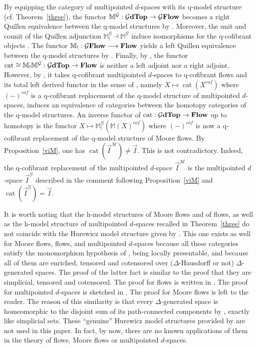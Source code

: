 \documentclass[a4paper,12pt]{amsart}
\renewcommand{\vec}{\overrightarrow}
\theoremstyle{definition}
\newcommand{\iso}{\cong}
\newcommand{\vI}{\vec{I}}
\newcommand{\ptop}[1]{{\brm{{#1}dTop}}}
\newcommand{\moore}{{\mathbb{M}}}
\newcommand{\lmoore}{\mathbb{M}_!}
\newcommand{\brm}[1]{{\rm{\mathbf{#1}}}}
\newcommand{\dtop}{{\brm{Flow}}}
\newcommand{\dtopG}{{\mathcal{G}\brm{Flow}}}
\DeclareMathOperator{\Cat}{\mathrm{cat}}
\begin{document}
By equipping the category of multipointed $d$-spaces with its q-model structure (cf. Theorem~\ref{three}), the functor $\moore^{\mathcal{G}}:\ptop{\mathcal{G}}\to\dtopG$ becomes a right Quillen equivalence between the q-model structures by \cite[Theorem~8.1]{Moore2}. Moreover, the unit and counit of the Quillen adjunction $\lmoore^{\mathcal{G}} \dashv \moore^{\mathcal{G}}$ induce isomorphisms for the q-cofibrant objects \cite[Theorem~7.6 and Corollary~7.9]{Moore2}. The functor $\lmoore:\dtopG \longrightarrow \dtop$ yields a left Quillen equivalence between the q-model structures by \cite[Theorem~10.9]{Moore1}. Finally, by \cite[Theorem~8.8]{Moore2}, the functor $\Cat\iso\lmoore\moore^{\mathcal{G}}:\ptop{\mathcal{G}}\to \dtop$ is neither a left adjoint nor a right adjoint. However, by \cite[Theorem~8.14]{Moore2}, it takes q-cofibrant multipointed $d$-spaces to q-cofibrant flows and its total left derived functor in the sense of \cite{HomotopicalCategory}, namely $X\mapsto \Cat(X^{cof})$ where $(-)^{cof}$ is a q-cofibrant replacement of the q-model structure of multipointed $d$-spaces, induces an equivalence of categories between the homotopy categories of the q-model structures. An inverse functor of $\Cat:\ptop{\mathcal{G}}\to \dtop$ up to homotopy is the functor $X\mapsto \lmoore^{\mathcal{G}}(\moore(X)^{cof})$ where $(-)^{cof}$ is now a q-cofibrant replacement of the q-model structure of Moore flows. By Proposition~\ref{viM}, one has $\Cat(\vI^{\mathcal{M}})\neq \vI$. This is not contradictory. Indeed, the q-cofibrant replacement of the multipointed $d$-space $\vI^{\mathcal{M}}$ is the multipointed $d$-space $\vI^{\mathcal{G}}$ described in the comment following Proposition~\ref{viM} and $\Cat(\vI^{\mathcal{G}})= \vI$.

It is worth noting that the h-model structures of Moore flows and of flows, as well as the h-model structure of multipointed $d$-spaces recalled in Theorem~\ref{three} do not coincide with the Hurewicz model structure given by \cite[Corollary~5.23]{Barthel-Riel}. This one exists as well for Moore flows, flows, and multipointed $d$-spaces because all these categories satisfy the monomorphism hypothesis of \cite[Definition~5.16]{Barthel-Riel}, being locally presentable, and because all of them are enriched, tensored and cotensored over ($\Delta$-Hausdorff or not) $\Delta$-generated spaces. The proof of the latter fact is similar to the proof that they are simplicial, tensored and cotensored. The proof for flows is written in \cite[Section~3.3]{realization}. The proof for multipointed $d$-spaces is sketched in \cite[Appendix~B]{mdtop}. The proof for Moore flows is left to the reader. The reason of this similarity is that every $\Delta$-generated space is homeomorphic to the disjoint sum of its path-connected components by \cite[Proposition~2.8]{mdtop}, exactly like simplicial sets. These ``genuine'' Hurewicz model structures provided by \cite[Corollary~5.23]{Barthel-Riel} are not used in this paper. In fact, by now, there are no known applications of them in the theory of flows, Moore flows or multipointed $d$-spaces.
\end{document}
